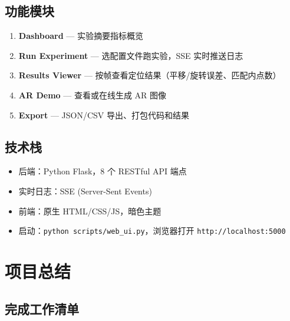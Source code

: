 \documentclass[12pt,a4paper]{ctexart}
\begin{document}
\subsection{功能模块}
\begin{enumerate}
  \item \textbf{Dashboard} — 实验摘要指标概览
  \item \textbf{Run Experiment} — 选配置文件跑实验，SSE 实时推送日志
  \item \textbf{Results Viewer} — 按帧查看定位结果（平移/旋转误差、匹配内点数）
  \item \textbf{AR Demo} — 查看或在线生成 AR 图像
  \item \textbf{Export} — JSON/CSV 导出、打包代码和结果
\end{enumerate}

\subsection{技术栈}
\begin{itemize}
  \item 后端：Python Flask，8 个 RESTful API 端点
  \item 实时日志：SSE (Server-Sent Events)
  \item 前端：原生 HTML/CSS/JS，暗色主题
  \item 启动：\texttt{python scripts/web\_ui.py}，浏览器打开 \texttt{http://localhost:5000}
\end{itemize}

\section{项目总结}

\subsection{完成工作清单}
\end{document}
